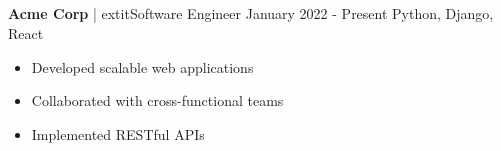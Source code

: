 \documentclass{article}%
\begin{document}
%
\normalsize%
\subsection*{}%
\label{subsec:}%
\noindent%
\textbf{Acme Corp} | 	extit{Software Engineer} \hfill January 2022 - Present%
\newline%
%
Python, Django, React%
\newline%
%
\begin{itemize}%
\item Developed scalable web applications%
\item Collaborated with cross-functional teams%
\item Implemented RESTful APIs%
\end{itemize}%
\newline%

%
\end{document}
